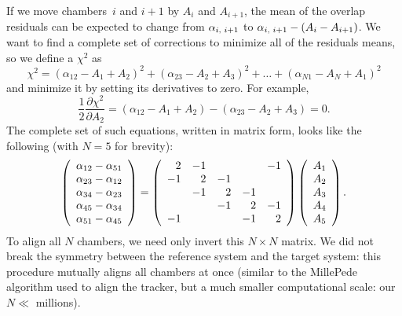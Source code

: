 \documentclass[12pt]{article}
\begin{document}
If we move chambers~$i$ and $i+1$ by $A_i$ and $A_{i+1}$, the mean of
the overlap residuals can be expected to change from
$\alpha_{i\mbox{\scriptsize, }i+1}$ to
$\alpha_{i\mbox{\scriptsize, }i+1} - (A_i - A_{i+1})$.  We want to find
a complete set of corrections to minimize all of the residuals means,
so we define a $\chi^2$ as
\begin{equation}
\chi^2 = (\alpha_{12} - A_1 + A_2)^2 + (\alpha_{23} - A_2 + A_3)^2 + \ldots + (\alpha_{N1} - A_N + A_1)^2
\end{equation}
and minimize it by setting its derivatives to zero.  For example,
\begin{equation}
\frac{1}{2} \frac{\partial \chi^2}{\partial A_2} = (\alpha_{12} - A_1 + A_2) - (\alpha_{23} - A_2 + A_3) = 0 \mbox{.}
\end{equation}
The complete set of such equations, written in matrix form, looks like
the following (with $N=5$ for brevity):
\begin{equation}
\left(\begin{array}{c}
\alpha_{12} - \alpha_{51} \\
\alpha_{23} - \alpha_{12} \\
\alpha_{34} - \alpha_{23} \\
\alpha_{45} - \alpha_{34} \\
\alpha_{51} - \alpha_{45}
\end{array} \right)
=
\left(\begin{array}{r r r r r}
2 & -1 &  &  & -1 \\
-1 & 2 & -1 &  &  \\
 & -1 & 2 & -1 &  \\
 &  & -1 & 2 & -1 \\
-1 &  &  & -1 & 2
\end{array}\right)
\left(\begin{array}{c}
A_1 \\
A_2 \\
A_3 \\
A_4 \\
A_5 \\
\end{array} \right)\mbox{.}
\label{eqn:NbyNmatrix}
\end{equation}
To align all $N$ chambers, we need only invert this $N\times N$
matrix.  We did not break the symmetry between the reference system
and the target system: this procedure mutually aligns all chambers at
once (similar to the MillePede algorithm used to align the tracker,
but a much smaller computational scale: our $N \ll$ millions).
\end{document}
